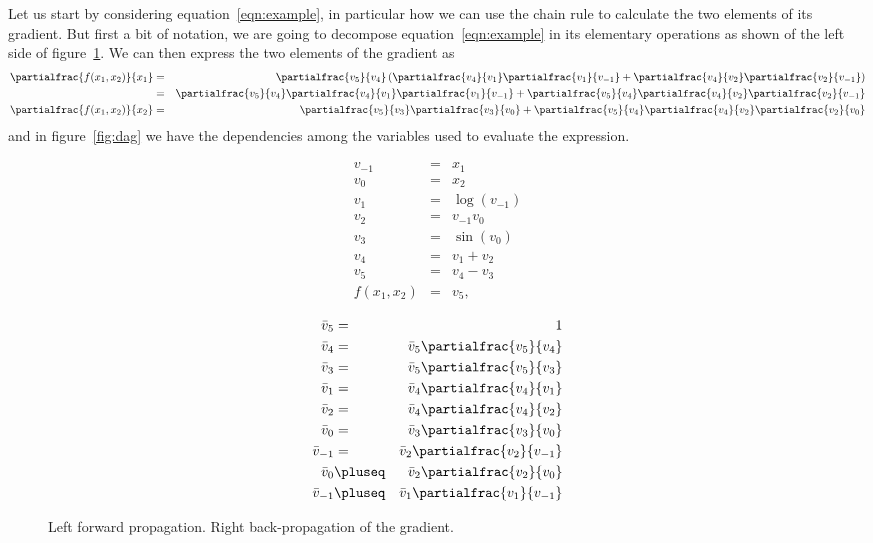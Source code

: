\documentclass{article}
\begin{document}
Let us start by considering equation~\ref{eqn:example}, in particular how we can
use the chain rule to calculate the two elements of its gradient. But first a
bit of notation, we are going to decompose equation~\ref{eqn:example} in its
elementary operations as shown of the left side of figure~\ref{fig:example}.
We can then express the two elements of the gradient as
\begin{eqnarray*}
\partialfrac{f(x_1,x_2)}{x_1}
&=& \partialfrac{v_5}{v_4}\left(\partialfrac{v_4}{v_1}\partialfrac{v_1}{v_{-1}}
	+ \partialfrac{v_4}{v_2}\partialfrac{v_2}{v_{-1}}\right) \\
&=& \partialfrac{v_5}{v_4}\partialfrac{v_4}{v_1}\partialfrac{v_1}{v_{-1}}
	+ \partialfrac{v_5}{v_4}\partialfrac{v_4}{v_2}\partialfrac{v_2}{v_{-1}} \\
\partialfrac{f(x_1,x_2)}{x_2}
&=& \partialfrac{v_5}{v_3}\partialfrac{v_3}{v_0}
	+ \partialfrac{v_5}{v_4}\partialfrac{v_4}{v_2}\partialfrac{v_2}{v_0}
\end{eqnarray*}
and in figure~\ref{fig:dag} we have the dependencies among the variables used
to evaluate the expression.

\begin{figure}
\begin{minipage}{.5\textwidth}
\begin{eqnarray*}
v_{-1} &=& x_1 \\
v_0 &=& x_2 \\
v_1 &=& \log(v_{-1}) \\
v_2 &=& v_{-1}v_0 \\
v_3 &=& \sin(v_0) \\
v_4 &=& v_1+v_2 \\
v_5 &=& v_4-v_3 \\
f(x_1,x_2) &=& v_5,
\end{eqnarray*}
\end{minipage}
\begin{minipage}{.5\textwidth}
\makepartialfractextstyle
\begin{eqnarray*}
\bar v_5 &=& 1 \\
\bar v_4 &=& \bar v_5 \partialfrac{v_5}{v_4} \\
\bar v_3 &=& \bar v_5 \partialfrac{v_5}{v_3} \\
\bar v_1 &=& \bar v_4 \partialfrac{v_4}{v_1} \\
\bar v_2 &=& \bar v_4 \partialfrac{v_4}{v_2} \\
\bar v_0 &=& \bar v_3 \partialfrac{v_3}{v_0} \\
\bar v_{-1} &=& \bar v_2 \partialfrac{v_2}{v_{-1}} \\
\bar v_0 &\pluseq& \bar v_2 \partialfrac{v_2}{v_0} \\
\bar v_{-1} &\pluseq& \bar v_1 \partialfrac{v_1}{v_{-1}}
\end{eqnarray*}
\end{minipage}
\label{fig:example}
\caption{Left forward propagation. Right back-propagation of the gradient.}
\end{figure}
\end{document}

